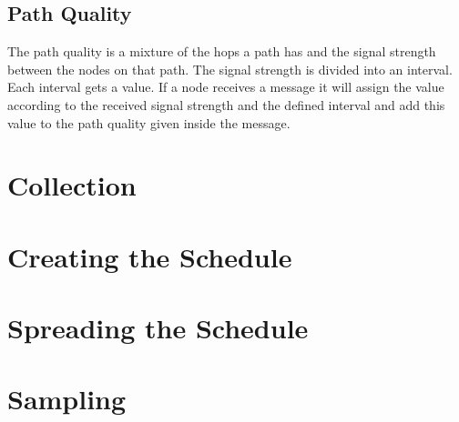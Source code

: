 \subsection{Path Quality}
The path quality is a mixture of the hops a path has and the signal strength between the nodes on that path. The signal strength is divided into an interval. Each interval gets a value. If a node receives a message it will assign the value according to the received signal strength and the defined interval and add this value to the path quality given inside the message. 
\section{Collection}

\section{Creating the Schedule}
\section{Spreading the Schedule}
\section{Sampling}
